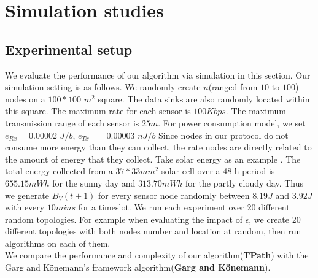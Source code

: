 \documentclass{article}
\begin{document}
\section{Simulation studies}
\subsection{Experimental setup}
We evaluate the performance of our algorithm via simulation in this section.
Our simulation setting is as follows. We randomly create $n$(ranged from $10$ to $100$) nodes
on a $100*100$ $m^2$ square. The data sinks are also randomly located within this square. The maximum rate for each sensor is $100 Kbps$. The maximum transmission range of each sensor is $25 m$. For power consumption model, we set $e_{Rx} = 0.00002$ $J/b$, $e_{Tx}$ $=$ $0.00003$ $nJ/b$ \cite{Wire} Since nodes in our protocol do not 
consume more energy than they can collect, the rate nodes are directly related to the amount of energy that they collect. Take solar energy as an example \cite{Ste}. The total energy collected from a $37 * 33 mm^2$ solar cell over a 48-h period is $655.15 mWh$ for the sunny day and $313.70 mWh$ for the partly cloudy day. Thus we generate $B_V(t+1)$ for every sensor node randomly between $8.19 J$ and $3.92 J$ with every $10 mins$ for a timeslot. We run each experiment over 20 different random topologies. For example when evaluating the impact of $\epsilon$, we create 20 different topologies with both nodes number and location at random, then run algorithms on each of them.\\
We compare the performance and complexity of our algorithm(\textbf{TPath}) with the Garg and K\"{o}nemann's framework algorithm(\textbf{Garg and K\"{o}nemann}).








\end{document}
